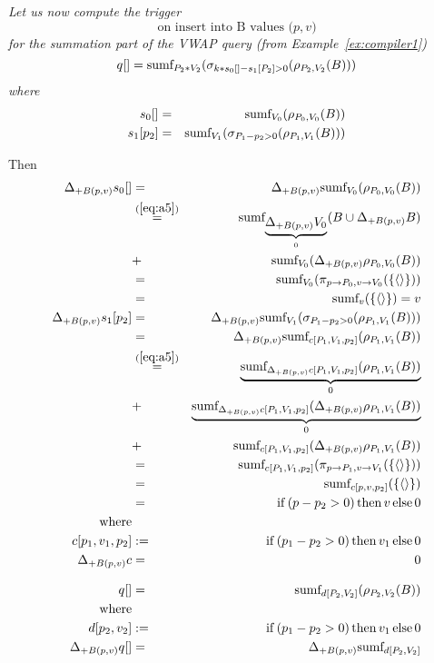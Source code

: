 \begin{example}\em
Let us now compute the trigger
\[
\mbox{on insert into B values ($p, v$)}
\]
for the summation part of the VWAP query (from Example~\ref{ex:compiler1})
\[
q[] = \mbox{sumf}_{P_2 * V_2}(\sigma_{k * s_0[] - s_1[P_2] > 0}(\rho_{P_2, V_2}(B)))
\]
where
\begin{eqnarray*}
s_0[]    &=& \mbox{sumf}_{V_0}(\rho_{P_0, V_0}(B))
\\
s_1[p_2] &=& \mbox{sumf}_{V_1}(\sigma_{P_1 - p_2 > 0}(\rho_{P_1, V_1}(B)))
\end{eqnarray*}

Then
\begin{eqnarray*}
\Delta_{+B(p,v)} s_0[] &=&
   \Delta_{+B(p,v)} \mbox{sumf}_{V_0}(\rho_{P_0, V_0}(B))
\\
&\stackrel{(\ref{eq:a5})}{=}& 
   \mbox{sumf}_{\underbrace{\Delta_{+B(p,v)} V_0}_{0}}(
      B \cup \Delta_{+B(p,v)} B)
\\
&+& \mbox{sumf}_{V_0}(\Delta_{+B(p,v)} \rho_{P_0, V_0}(B))
\\
&=& \mbox{sumf}_{V_0}(\pi_{p \rightarrow P_0, v \rightarrow V_0}(\{{\langle\rangle}\}))
\\
&=& \mbox{sumf}_v(\{{\langle\rangle}\}) = v
\\
\Delta_{+B(p,v)} s_1[p_2] &=&
   \Delta_{+B(p,v)} \mbox{sumf}_{V_1}(\sigma_{P_1 - p_2 > 0}(\rho_{P_1, V_1}(B)))
\\
&=& \Delta_{+B(p,v)} \mbox{sumf}_{c[P_1,V_1,p_2]}(\rho_{P_1, V_1}(B))
\\
&\stackrel{(\ref{eq:a5})}{=}&
   \underbrace{\mbox{sumf}_{\Delta_{+B(p,v)} c[P_1,V_1,p_2]}
      (\rho_{P_1, V_1}(B))}_{0}
\\
&+& \underbrace{\mbox{sumf}_{\Delta_{+B(p,v)} c[P_1,V_1,p_2]}(\Delta_{+B(p,v)} \rho_{P_1, V_1}(B))}_{0}
\\
&+& \mbox{sumf}_{c[P_1,V_1,p_2]}(\Delta_{+B(p,v)} \rho_{P_1, V_1}(B))
\\
&=&
   \mbox{sumf}_{c[P_1,V_1,p_2]}(\pi_{p \rightarrow P_1, v \rightarrow V_1}(\{{\langle\rangle}\}))
\\
&=&
   \mbox{sumf}_{c[p,v,p_2]}(\{{\langle\rangle}\})
\\
&=& \mathrm{if}\, (p - p_2 > 0) \, \mathrm{then}\, v \, \mathrm{else} \, 0
\\
\mbox{where}
\\
c[p_1,v_1,p_2] &:=&
   \mathrm{if}\, (p_1 - p_2 > 0) \, \mathrm{then}\, v_1 \, \mathrm{else} \, 0
\\
\Delta_{+B(p,v)} c &=& 0
\\[2ex]
q[] &=& \mbox{sumf}_{d[P_2, V_2]}(\rho_{P_2,V_2}(B))
\\
\mbox{where}
\\
d[p_2,v_2] &:=&
   \mathrm{if}\, (p_1 - p_2 > 0) \, \mathrm{then}\, v_1 \, \mathrm{else} \, 0
\\
\Delta_{+B(p,v)} q[] &=&
   \Delta_{+B(p,v)} \mbox{sumf}_{d[P_2, V_2]}
\end{eqnarray*}


\end{example}
